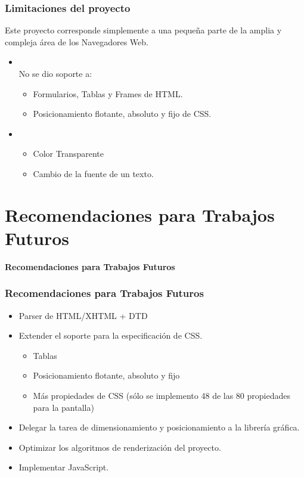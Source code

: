 \documentclass[12pt]{beamer}
\begin{document}
\begin{frame}
\frametitle{Limitaciones del proyecto}
\begin{block}{}
Este proyecto corresponde simplemente a una pequeña parte de la amplia y compleja área de los
Navegadores Web.
\end{block}

\begin{itemize}
	\item {}\\
	No se dio soporte a:
	\begin{itemize}
		\item Formularios, Tablas y Frames de HTML.
		\item Posicionamiento flotante, absoluto y fijo de CSS.
	\end{itemize}
	\item {}\\
	\begin{itemize}
		\item Color Transparente
		\item Cambio de la fuente de un texto.
	\end{itemize}
\end{itemize}
\end{frame}

\section[Recomendaciones]{Recomendaciones para Trabajos Futuros}

\begin{frame}
\begin{center}
	\textbf{\Large Recomendaciones para Trabajos Futuros}
\end{center}
\end{frame}


\begin{frame}
\frametitle{Recomendaciones para Trabajos Futuros}

\begin{itemize}
	\item Parser de HTML/XHTML + DTD
	\item Extender el soporte para la especificación de CSS.
		\begin{itemize}
			\item Tablas
			\item Posicionamiento flotante, absoluto y fijo
			\item Más propiedades de CSS (sólo se implemento 48 de las 80 propiedades para la pantalla)
		\end{itemize}
	\item Delegar la tarea de dimensionamiento y posicionamiento a la librería gráfica.
	\item Optimizar los algoritmos de renderización del proyecto.
	\item Implementar JavaScript.
\end{itemize}
\end{frame}
\end{document}

